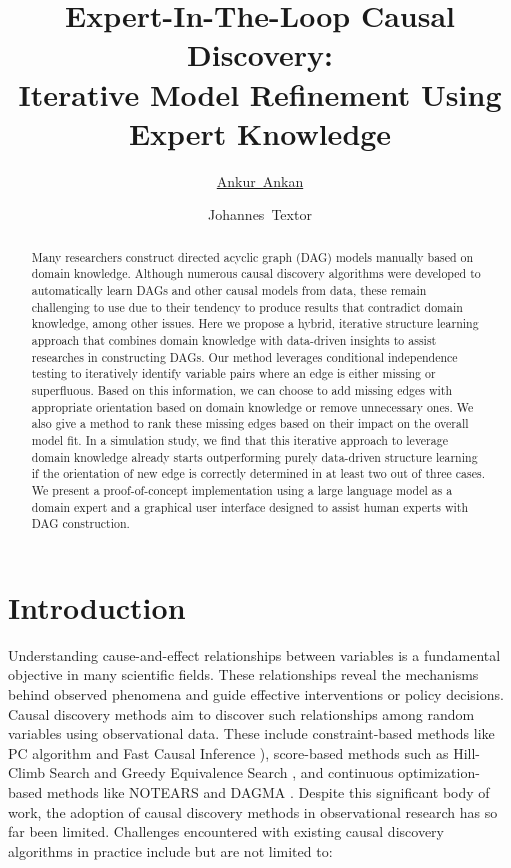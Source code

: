 \documentclass[accepted]{uai2025} %
\title{Expert-In-The-Loop Causal Discovery: \\ Iterative Model Refinement Using Expert Knowledge}
\author[1]{\href{mailto:<ankur.ankan@ru.nl>?Subject=Your UAI 2025 paper}{Ankur~Ankan}{}}
\author[1]{Johannes~Textor}
\affil[1]{%
    Institute for Computing and Information Sciences\\
    Radboud University\\
    Nijmegen, The Netherlands
}
\begin{document}
\maketitle

\begin{abstract}
	Many researchers construct directed acyclic graph (DAG) models manually
	based on domain knowledge. 
	Although numerous causal discovery algorithms were developed to automatically learn
	DAGs and other causal models from data, these remain challenging to 
	use due to their tendency to produce results that contradict
	domain knowledge, among other issues. Here we propose a hybrid, 
	iterative structure learning approach that combines domain knowledge with
	data-driven insights to assist researches in constructing DAGs.
	Our method leverages conditional independence
	testing to iteratively identify variable pairs where an edge is
	either missing or superfluous. Based on this information, we can choose
	to add missing edges with appropriate orientation based on domain
	knowledge or remove unnecessary ones. We also give a method to rank
	these missing edges based on their impact on the overall model fit.
	In a simulation study, we find that this iterative approach to leverage domain 
	knowledge already starts outperforming purely data-driven structure learning if 
	the orientation of new edge is correctly determined in at least two out of three cases.
	We present a proof-of-concept implementation using a large language 
	model as a domain expert and a graphical user interface designed to 
	assist human experts with DAG construction.
\end{abstract}

\section{Introduction}
Understanding cause-and-effect relationships between variables is a fundamental
objective in many scientific fields. These relationships reveal the mechanisms
behind observed phenomena and guide effective interventions or policy
decisions. Causal discovery methods aim to discover such relationships among
random variables using observational data. These
include constraint-based methods like PC algorithm \citep{Spirtes2001,KalischB07} 
and Fast Causal Inference \citep{Spirtes2000}), score-based methods such as Hill-Climb
Search and Greedy Equivalence Search \citep{Chickering2002}, and continuous
optimization-based methods like NOTEARS \citep{Zheng2018} and DAGMA
\citep{Bello2022}. Despite this significant body of work,
the adoption of causal discovery methods in observational research has so far 
been limited. Challenges encountered with existing
causal discovery algorithms in practice include but are not limited to:
\end{document}
